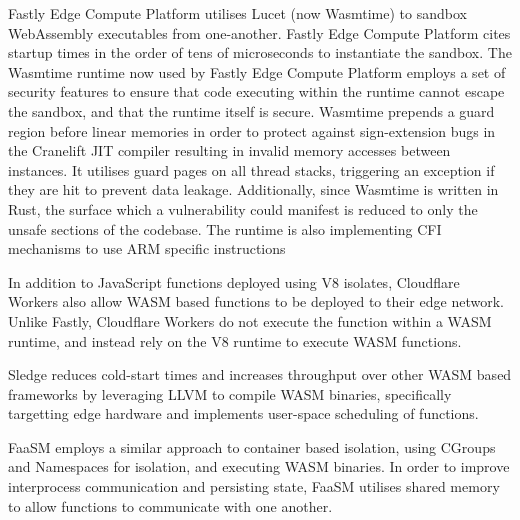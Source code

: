 Fastly Edge Compute Platform\cite{EdgeCloudPlatform} utilises Lucet\cite{BytecodeallianceLucet2024} (now Wasmtime\cite{Wasmtime}) to sandbox WebAssembly executables from one-another. Fastly Edge Compute Platform cites startup times in the order of tens of microseconds to instantiate the sandbox. The Wasmtime runtime now used by Fastly Edge Compute Platform employs a set of security features to ensure that code executing within the runtime cannot escape the sandbox, and that the runtime itself is secure\cite{SecurityWasmtime}. Wasmtime prepends a guard region before linear memories in order to protect against sign-extension bugs in the Cranelift JIT compiler resulting in invalid memory accesses between instances. It utilises guard pages on all thread stacks, triggering an exception if they are hit to prevent data leakage. Additionally, since Wasmtime is written in Rust, the surface which a vulnerability could manifest is reduced to only the unsafe sections of the codebase. The runtime is also implementing CFI mechanisms to use ARM specific instructions

In addition to JavaScript functions deployed using V8 isolates, Cloudflare Workers\cite{CloudComputingContainers2018} also allow WASM based functions to be deployed to their edge network. Unlike Fastly, Cloudflare Workers do not execute the function within a WASM runtime, and instead rely on the V8 runtime to execute WASM functions\cite{WebAssemblyWasmCloudflare2024}.

Sledge reduces cold-start times and increases throughput over other WASM based \faas{} frameworks by leveraging LLVM to compile WASM binaries, specifically targetting edge hardware and implements user-space scheduling of functions\cite{gadepalliSledgeServerlessfirstLightweight2020}.

FaaSM employs a similar approach to container based isolation, using CGroups and Namespaces for isolation, and executing WASM binaries. In order to improve interprocess communication and persisting state, FaaSM utilises shared memory to allow functions to communicate with one another\cite{shillakerFaasmLightweightIsolation2020}.
